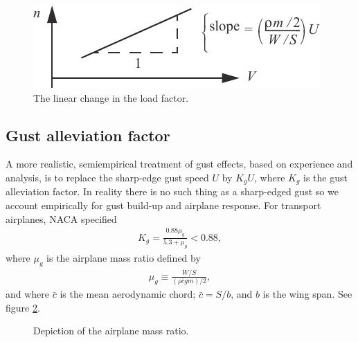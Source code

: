 \documentclass{AeroStructure-ERJohnson}
\begin{document}
\begin{figure}
\vspace{-30pt}
\includegraphics{Figure_2-18.pdf}
\caption{The linear change in the load factor.\label{fig2.18}}
\end{figure}



\subsection{Gust alleviation factor}\label{sec2.5.1}

A more realistic, semiempirical treatment of gust effects, based on experience and analysis, is to replace the sharp-edge gust speed $U$ by $K_{g} U$, where $K_{g}$ is the gust alleviation factor. In reality there is no such thing as a sharp-edged gust so we account empirically for gust build-up and airplane response. For transport airplanes, NACA specified
\begin{align}\label{eq2.50}
K_{g}=\frac{0.88 \mu_{g}}{5.3+\mu_{g}}<0.88,
\end{align}
where $\mu_{g}$ is the airplane mass ratio defined by\vspace*{-9pt}
\begin{align}\label{eq2.51}
\mu_{g} \equiv \frac{W/S}{(\rho \bar{c} g m)/2},
\end{align}
and where $\bar{c}$ is the mean aerodynamic chord; $\bar{c}=S/b$, and $b$ is the wing span. See figure \ref{fig2.19}.

{\def\thefigure{2.19}
\begin{figure}
\caption{Depiction of the airplane mass ratio.\label{fig2.19}}
\end{figure}}
\end{document}
